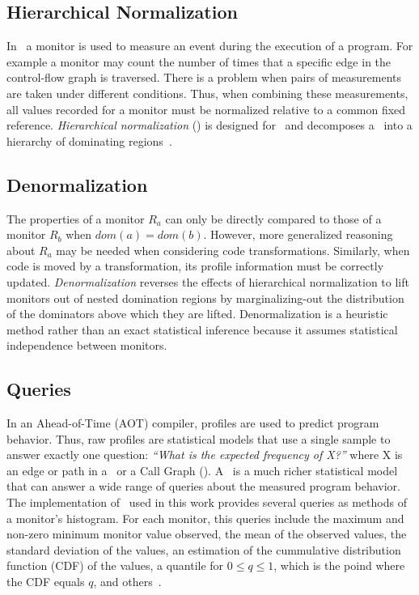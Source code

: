 \subsection{Hierarchical Normalization}
\label{cp:hn}

In \CP\ a monitor is used to measure an event during the execution of a program. For example a monitor may count the number of times that a specific edge in the control-flow graph is traversed. There is a problem when pairs of measurements are taken under different
conditions.  Thus, when
combining these measurements, all values recorded for a monitor must
be normalized relative to a common fixed reference.  {\em Hierarchical
  normalization} (\HN)  is designed for
\CP\ and decomposes a \CFG\ into a hierarchy
of dominating regions~\cite{BerubePhD}.

\subsection{Denormalization}
\label{cp:denorm}

The properties of a monitor $R_a$ can only be directly compared to
those of a monitor $R_b$ when $dom(a) = dom(b)$.  However, more
generalized reasoning about $R_a$ may be needed when considering code
transformations.  Similarly, when code is moved by a transformation,
its profile information must be correctly updated. {\it
  Denormalization} reverses the effects of hierarchical normalization
to lift monitors out of nested domination regions by marginalizing-out
the distribution of the dominators above which they are lifted.
Denormalization is a heuristic method rather than an exact statistical
inference because it assumes statistical independence between monitors.

\subsection{Queries}
\label{cp:queries}

In an Ahead-of-Time (AOT) compiler, profiles are used to predict program behavior.
Thus, raw profiles are statistical models that use a single sample to
answer exactly one question: {\em ``What is the expected frequency of
  X?''}  where X is an edge or path in a \CFG\ or a Call Graph (\CG).
A \CP\ is a much richer statistical model that can answer a wide range
of queries about the measured program behavior.  The implementation of
\CP\ used in this work provides several queries as
methods of a monitor's histogram. For each monitor, this queries include the maximum and non-zero minimum monitor value observed, the mean of the observed values, the standard deviation of the values, an estimation of the cummulative distribution function (CDF) of the values, a quantile for $0 \leq q \leq 1$, which is the poind where the CDF equals $q$, and others~\cite{BerubePhD}. 

